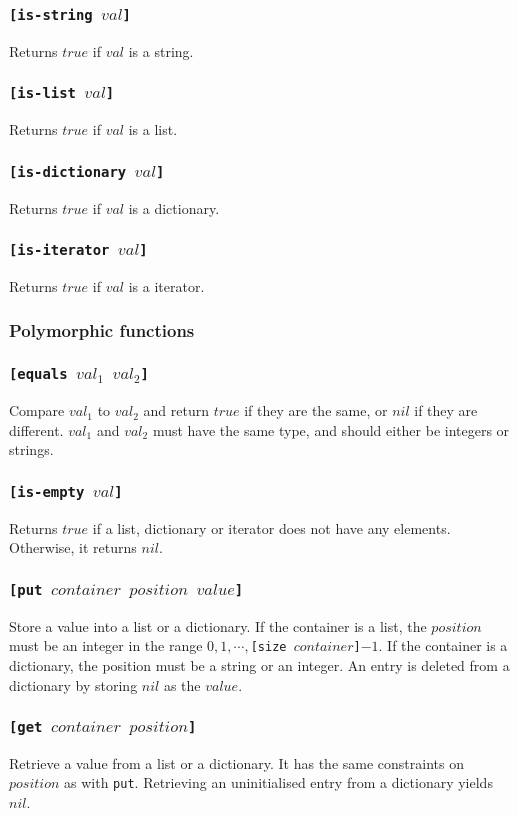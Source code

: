 \documentclass[11pt]{report}
\begin{document}
\subsubsection*{\tt{[is-string }$val$\tt{]}}
Returns $true$ if $val$ is a string.
\subsubsection*{\tt{[is-list }$val$\tt{]}}
Returns $true$ if $val$ is a list.
\subsubsection*{\tt{[is-dictionary }$val$\tt{]}}
Returns $true$ if $val$ is a dictionary.
\subsubsection*{\tt{[is-iterator }$val$\tt{]}}
Returns $true$ if $val$ is a iterator.

\subsubsection{Polymorphic functions}
\subsubsection*{\tt{[equals }$val_1$ $val_2$\tt{]}}
Compare $val_1$ to $val_2$ and return $true$ if they are the same, or $nil$ if they are different. $val_1$ and $val_2$ must have the same type, and should either be integers or strings.
\subsubsection*{\tt{[is-empty }$val$\tt{]}}
Returns $true$ if a list, dictionary or iterator does not have any elements. Otherwise, it returns $nil$.
\subsubsection*{\tt{[put }$container$ $position$ $value$\tt{]}}
Store a value into a list or a dictionary. If the container is a list, the $position$ must be an integer in the range $0,1, \cdots, ${\tt{[size }}$container${\tt{]}}$-1$.
If the container is a dictionary, the position must be a string or an integer. An entry is deleted from a dictionary by storing $nil$ as the $value$.
\subsubsection*{\tt{[get }$container$ $position$\tt{]}}
Retrieve a value from a list or a dictionary. It has the same constraints on $position$ as with \verb|put|. Retrieving an uninitialised entry from a dictionary yields $nil$.
\end{document}

